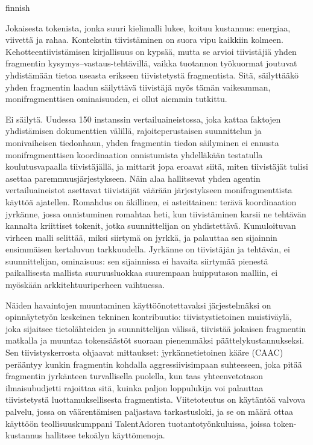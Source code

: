 \begin{thesisabstract}{finnish}

    Jokaisesta tokenista, jonka suuri kielimalli lukee, koituu kustannus: energiaa, viivettä ja rahaa. Kontekstin tiivistäminen on suora vipu kaikkiin kolmeen. Kehotteentiivistämisen kirjallisuus on kypsää, mutta se arvioi tiivistäjiä yhden fragmentin kysymys--vastaus-tehtävillä, vaikka tuotannon työkuormat joutuvat yhdistämään tietoa useasta erikseen tiivistetystä fragmentista. Sitä, säilyttääkö yhden fragmentin laadun säilyttävä tiivistäjä myös tämän vaikeamman, monifragmenttisen ominaisuuden, ei ollut aiemmin tutkittu.

    Ei säilytä. Uudessa 150 instanssin vertailuaineistossa, joka kattaa faktojen yhdistämisen dokumenttien välillä, rajoiteperustaisen suunnittelun ja monivaiheisen tiedonhaun, yhden fragmentin tiedon säilyminen ei ennusta monifragmenttisen koordinaation onnistumista yhdelläkään testatulla koulutusvapaalla tiivistäjällä, ja mittarit jopa eroavat siitä, miten tiivistäjät tulisi asettaa paremmuusjärjestykseen. Näin alaa hallitsevat yhden agentin vertailuaineistot asettavat tiivistäjät väärään järjestykseen monifragmenttista käyttöä ajatellen. Romahdus on äkillinen, ei asteittainen: terävä koordinaation jyrkänne, jossa onnistuminen romahtaa heti, kun tiivistäminen karsii ne tehtävän kannalta kriittiset tokenit, jotka suunnittelijan on yhdistettävä. Kumuloituvan virheen malli selittää, miksi siirtymä on jyrkkä, ja palauttaa sen sijainnin ensimmäisen kertaluvun tarkkuudella. Jyrkänne on tiivistäjän ja tehtävän, ei suunnittelijan, ominaisuus: sen sijainnissa ei havaita siirtymää pienestä paikallisesta mallista suuruusluokkaa suurempaan huipputason malliin, ei myöskään arkkitehtuuriperheen vaihtuessa.
    
    Näiden havaintojen muuntaminen käyttöönotettavaksi järjestelmäksi on opinnäytetyön keskeinen tekninen kontribuutio: tiivistystietoinen muistiväylä, joka sijaitsee tietolähteiden ja suunnittelijan välissä, tiivistää jokaisen fragmentin matkalla ja muuntaa tokensäästöt suoraan pienemmäksi päättelykustannukseksi. Sen tiivistyskerrosta ohjaavat mittaukset: jyrkännetietoinen kääre (CAAC) perääntyy kunkin fragmentin kohdalla aggressiivisimpaan suhteeseen, joka pitää fragmentin jyrkänteen turvallisella puolella, kun taas yhteenvetotason ilmaisubudjetti rajoittaa sitä, kuinka paljon loppulukija voi palauttaa tiivistetystä luottamuksellisesta fragmentista. Viitetoteutus on käytäntöä valvova palvelu, jossa on väärentämisen paljastava tarkastusloki, ja se on määrä ottaa käyttöön teollisuuskumppani TalentAdoren tuotantotyönkuluissa, joissa token-kustannus hallitsee tekoälyn käyttömenoja.
    
\end{thesisabstract}
